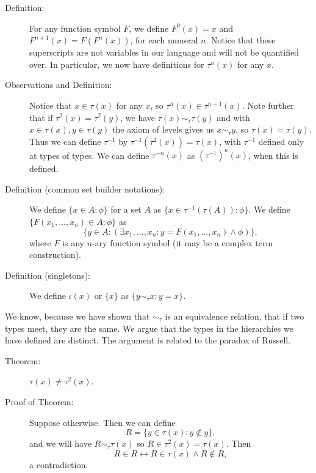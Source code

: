 \documentclass[12pt]{book}
\begin{document}
\begin{description}

\item[Definition:]  For any function symbol $F$, we define $F^0(x) = x$ and $F^{n+1}(x) = F(F^n(x))$, for each numeral $n$.  Notice that these superscripts
are not variables in our language and will not be quantified over.  In particular, we now have definitions for $\tau^n(x)$ for any $x$.

\item[Observations and Definition:]  Notice that $x \in \tau(x)$ for any $x$, so $\tau^n(x) \in \tau^{n+1}(x)$.  Note further that if $\tau^2(x) = \tau^2(y)$, we have
$\tau(x) \sim_\tau \tau(y)$ and with $x \in \tau(x),y \in \tau(y)$ the axiom of levels gives us $x \sim_\tau y$, so $\tau(x)=\tau(y)$.  Thus we can define $\tau^{-1}$ by
$\tau^{-1}(\tau^2(x)) = \tau(x)$, with $\tau^{-1}$ defined only at types of types.  We can define $\tau^{-n}(x)$ as $(\tau^{-1})^n(x)$, when this is defined.

\item[Definition (common set builder notations):]  We define $\{x \in A:\phi\}$ for a set $A$ as $\{x \in \tau^{-1}(\tau(A)):\phi\}$.  We define $\{F(x_1,\ldots,x_n) \in A:\phi\}$ as $$\{y \in A:(\exists x_1,\ldots,x_n:y = F(x_1,\ldots,x_n) \wedge \phi)\},$$ where $F$ is any $n$-ary  function symbol (it may be a complex term construction).

\item[Definition (singletons):]  We define $\iota(x)$ or $\{x\}$ as $\{y \sim_\tau x:y=x\}$.

\end{description}

We know, because we have shown that $\sim_\tau$ is an equivalence relation, that if two types meet, they are the same.  We argue that the types in the hierarchies we have defined are distinct.  The argument is related to the paradox of Russell.

\begin{description}

\item[Theorem:]  $\tau(x) \neq \tau^2(x)$.

\item[Proof of Theorem:]  Suppose otherwise.  Then we can define $$R = \{y \in \tau(x):y \not\in y\},$$ and we will have $R \sim_\tau \tau(x)$ so $R \in \tau^2(x) = \tau(x)$.
Then $$R \in R \leftrightarrow R \in \tau(x) \wedge R \not\in R,$$ a contradiction.

\end{description}
\end{document}
